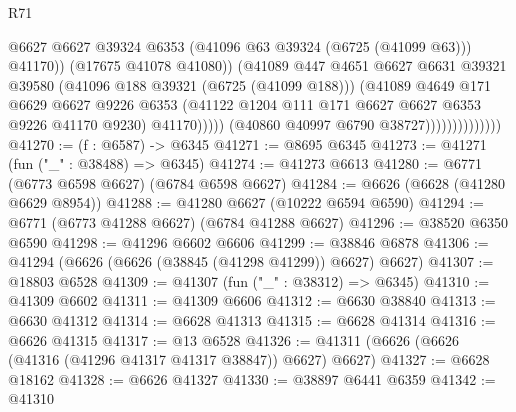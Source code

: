 \begin{lexlean}{R71}
\begin{coremodule}
                                          @6627
                                          @6627
                                          @39324
                                          @6353
                                          (@41096 @63 @39324 (@6725 (@41099 @63)))
                                          @41170))
                                      (@17675 @41078 @41080))
                                    (@41089
                                      @447
                                      @4651
                                      @6627
                                      @6631
                                      @39321
                                      @39580
                                      (@41096 @188 @39321 (@6725 (@41099 @188)))
                                      (@41089
                                        @4649
                                        @171
                                        @6629
                                        @6627
                                        @9226
                                        @6353
                                        (@41122
                                          @1204
                                          @111
                                          @171
                                          @6627
                                          @6627
                                          @6353
                                          @9226
                                          @41170
                                          @9230)
                                        @41170)))))
                              (@40860 @40997 @6790 @38727))))))))))))))
@41270 := (f : @6587) -> @6345
@41271 := @8695 @6345
@41273 := @41271 (fun ("_" : @38488) => @6345)
@41274 := @41273 @6613
@41280 := @6771 (@6773 @6598 @6627) (@6784 @6598 @6627)
@41284 := @6626 (@6628 (@41280 @6629 @8954))
@41288 := @41280 @6627 (@10222 @6594 @6590)
@41294 := @6771 (@6773 @41288 @6627) (@6784 @41288 @6627)
@41296 := @38520 @6350 @6590
@41298 := @41296 @6602 @6606
@41299 := @38846 @6878
@41306 := @41294 (@6626 (@6626 (@38845 (@41298 @41299)) @6627) @6627)
@41307 := @18803 @6528
@41309 := @41307 (fun ("_" : @38312) => @6345)
@41310 := @41309 @6602
@41311 := @41309 @6606
@41312 := @6630 @38840
@41313 := @6630 @41312
@41314 := @6628 @41313
@41315 := @6628 @41314
@41316 := @6626 @41315
@41317 := @13 @6528
@41326 := @41311 (@6626 (@6626 (@41316 (@41296 @41317 @41317 @38847)) @6627) @6627)
@41327 := @6628 @18162
@41328 := @6626 @41327
@41330 := @38897 @6441 @6359
@41342 := @41310

\end{coremodule}
\end{lexlean}
